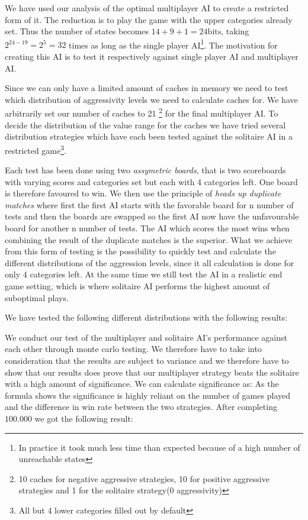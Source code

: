 We have used our analysis of the optimal multiplayer AI to create a restricted form of it. The reduction is to play the game with the upper categories already set. Thus the number of states becomes $14+9+1 = 24\mbox{bits}$, taking $2^{24-19} = 2^5 = 32$ times as long as the single player AI\footnote{In practice it took much less time than expected because of a high number of unreachable states}. The motivation for creating this AI is to test it respectively against single player AI and multiplayer AI. %

Since we can only have a limited amount of caches in memory we need to test which distribution of aggressivity levels we need to calculate caches for. We have arbitrarily set our number of caches to 21 \footnote{10 caches for negative aggressive strategies, 10 for positive aggressive strategies and 1 for the solitaire strategy(0 aggressivity)} for the final multiplayer AI. To decide the distribution of the value range for the caches  we have tried several distribution strategies which have each been tested against the solitaire AI in a restricted game\footnote{All but 4 lower categories filled out by default}. 
 
Each test has been done using two \emph{assymetric boards}, that is two scoreboards with varying scores and categories set but each with 4 categories left. One board is therefore favoured to win. We then use the principle of \emph{heads up duplicate matches} where first the first AI starts with the favorable board for n number of tests and then the boards are swapped so the first AI now have the unfavourable board for another n number of tests. The AI which scores the most wins when combining the result of the duplicate matches is the superior. What we achieve from this form of testing is the possibility to quickly test and calculate the different distributions of the aggression levels, since it all calculation is done for only 4 categories left. At the same time we still test the AI in a realistic end game setting, which is where solitaire AI performs the highest amount of suboptimal plays\citep{pawlewicz2011nearly}. %

We have tested the following different distributions with the following results: %

We conduct our test of the multiplayer and solitaire AI's performance against each other through monte carlo testing. We therefore have to take into consideration that the results are subject to variance and we therefore have to show that our results does prove that our multiplayer strategy beats the solitaire with a high amount of significance. We can calculate significance as: %
As the formula shows the significance is highly reliant on the number of games played and the difference in win rate between the two strategies. After completing $100.000$ we got the following result: %